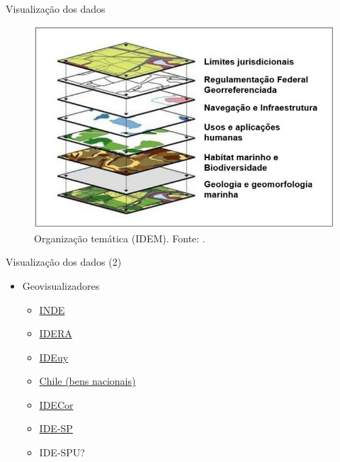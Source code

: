 \documentclass[9pt,ignorenonframetext,]{beamer}
\providecommand{\tightlist}{%
  \setlength{\itemsep}{0pt}\setlength{\parskip}{0pt}}
\begin{document}
\begin{frame}{Visualização dos dados}
\protect\hypertarget{visualizauxe7uxe3o-dos-dados}{}

\begin{figure}[H]

{\centering \includegraphics[width=0.7\linewidth]{Figura-4-Exemplo-da-organizacao-dos-temas-de-uma-IDEM_W640} 

}

\caption{Organização temática (IDEM). Fonte: \textcite{IDEM}.}\label{fig:unnamed-chunk-3}
\end{figure}

\end{frame}

\begin{frame}{Visualização dos dados (2)}
\protect\hypertarget{visualizauxe7uxe3o-dos-dados-2}{}

\begin{itemize}[<+->]
\tightlist
\item
  Geovisualizadores

  \begin{itemize}[<+->]
  \tightlist
  \item
    \href{https://visualizador.inde.gov.br/}{INDE}
  \item
    \href{https://mapa.idera.gob.ar/}{IDERA}
  \item
    \href{https://www.gub.uy/infraestructura-datos-espaciales/publico/visualizador}{IDEuy}
  \item
    \href{http://www.catastro.cl/}{Chile (bens nacionais)}
  \item
    \href{https://idecor.cba.gov.ar/}{IDECor}
  \item
    \href{http://www.idesp.sp.gov.br/Visualizador}{IDE-SP}
  \item
    IDE-SPU?
  \end{itemize}
\end{itemize}

\end{frame}
\end{document}
